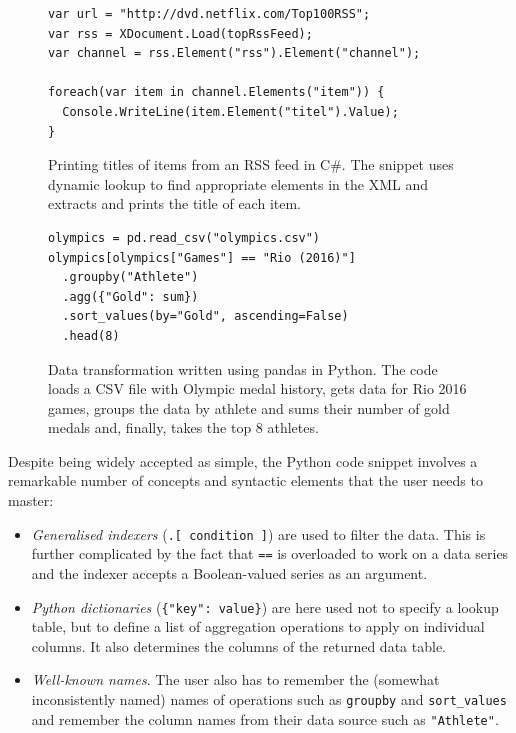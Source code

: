 \documentclass[fleqn,11pt]{report}
\theoremstyle{definition}
\newenvironment{nitemize}
{ \vspace{-0.4em}
  \begin{itemize}
    \setlength{\itemsep}{5pt}
    \setlength{\parskip}{0pt}
    \setlength{\parsep}{0pt} }
{ \end{itemize}
  \vspace{-0.4em} }
\begin{document}
\begin{figure}[h!]
\vspace{-0.33em}
\begin{lstlisting}[language=sharp]
var url = "http://dvd.netflix.com/Top100RSS";
var rss = XDocument.Load(topRssFeed);
var channel = rss.Element("rss").Element("channel");

foreach(var item in channel.Elements("item")) {
  Console.WriteLine(item.Element("titel").Value);
}
\end{lstlisting}
\vspace{-0.33em}
\caption{Printing titles of items from an RSS feed in C\#. The snippet uses dynamic lookup to
find appropriate elements in the XML and extracts and prints the title of each item.}
\label{fig:rss}
\end{figure}

\begin{figure}[t]
\begin{lstlisting}[language=ppython]
olympics = pd.read_csv("olympics.csv")
olympics[olympics["Games"] == "Rio (2016)"]
  .groupby("Athlete")
  .agg({"Gold": sum})
  .sort_values(by="Gold", ascending=False)
  .head(8)
\end{lstlisting}
\caption{Data transformation written using pandas in Python. The code loads a CSV file with
Olympic medal history, gets data for Rio 2016 games, groups the data by athlete and sums their
number of gold medals and, finally, takes the top 8 athletes.}
\label{fig:pandas}
\end{figure}

Despite being widely accepted as simple, the Python code snippet involves a remarkable number
of concepts and syntactic elements that the user needs to master:

\begin{nitemize}
\item \emph{Generalised indexers} (\texttt{.[ condition ]}) are used to filter the data. This is
  further complicated by the fact that \texttt{==} is overloaded to work on a data series and the
  indexer accepts a Boolean-valued series as an argument.
\item \emph{Python dictionaries} (\texttt{\{"key": value\}}) are here used not to specify a lookup
  table, but to define a list of aggregation operations to apply on individual columns. It also
  determines the columns of the returned data table.
\item \emph{Well-known names}. The user also has to remember the (somewhat inconsistently named)
  names of operations such as \texttt{groupby} and \texttt{sort\_values} and remember the
  column names from their data source such as \texttt{"Athlete"}.
\end{nitemize}
\end{document}
